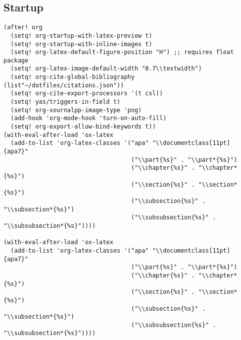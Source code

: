 \documentclass{assignments}
\begin{document}
\subsection*{Startup}
\label{sec:org2713d53}
\begin{verbatim}
(after! org
  (setq! org-startup-with-latex-preview t)
  (setq! org-startup-with-inline-images t)
  (setq! org-latex-default-figure-position "H") ;; requires float package
  (setq! org-latex-image-default-width "0.7\\textwidth")
  (setq! org-cite-global-bibliography (list"~/dotfiles/citations.json"))
  (setq! org-cite-export-processors '(t csl))
  (setq! yas/triggers-in-field t)
  (setq! org-xournalpp-image-type 'png)
  (add-hook 'org-mode-hook 'turn-on-auto-fill)
  (setq! org-export-allow-bind-keywords t))
(with-eval-after-load 'ox-latex
  (add-to-list 'org-latex-classes '("apa" "\\documentclass[11pt]{apa7}"
                                    ("\\part{%s}" . "\\part*{%s}")
                                    ("\\chapter{%s}" . "\\chapter*{%s}")
                                    ("\\section{%s}" . "\\section*{%s}")
                                    ("\\subsection{%s}" . "\\subsection*{%s}")
                                    ("\\subsubsection{%s}" . "\\subsubsection*{%s}"))))

(with-eval-after-load 'ox-latex
  (add-to-list 'org-latex-classes '("apa" "\\documentclass[11pt]{apa7}"
                                    ("\\part{%s}" . "\\part*{%s}")
                                    ("\\chapter{%s}" . "\\chapter*{%s}")
                                    ("\\section{%s}" . "\\section*{%s}")
                                    ("\\subsection{%s}" . "\\subsection*{%s}")
                                    ("\\subsubsection{%s}" . "\\subsubsection*{%s}"))))


\end{verbatim}
\end{document}
